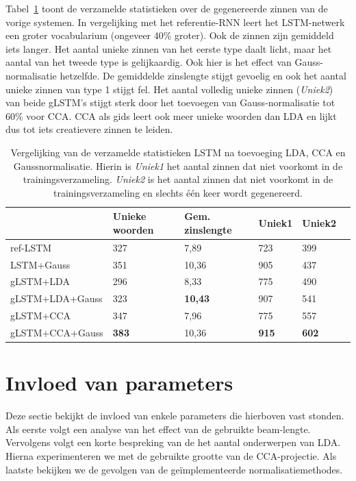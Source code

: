 Tabel~\ref{table:lstm_stats} toont de verzamelde statistieken over de gegenereerde zinnen van de vorige systemen. In vergelijking met het referentie-RNN leert het LSTM-netwerk een groter vocabularium (ongeveer 40\% groter). Ook de zinnen zijn gemiddeld iets langer. Het aantal unieke zinnen van het eerste type daalt licht, maar het aantal van het tweede type is gelijkaardig.
Ook hier is het effect van Gauss-normalisatie hetzelfde. De gemiddelde zinslengte stijgt gevoelig en ook het aantal unieke zinnen van type 1 stijgt fel. Het aantal volledig unieke zinnen (\emph{Uniek2}) van beide gLSTM's stijgt sterk door het toevoegen van Gauss-normalisatie tot 60\% voor CCA. CCA als gids leert ook meer unieke woorden dan LDA en lijkt dus tot iets creatievere zinnen te leiden.
    \begin{table}
    	\centering
    	\begin{tabular}{llllll}
    		~                   & Unieke woorden & Gem. zinslengte & Uniek1 & Uniek2 \\ \hline
    		ref-LSTM         				  & 327   & 7,89   & 723   & 399  \\
    		LSTM+Gauss        				  & 351   & 10,36   & 905   & 437  \\
    		gLSTM+LDA         				  & 296   & 8,33   & 775   & 490     \\
    		gLSTM+LDA+Gauss 				  & 323   & \textbf{10,43}   & 907   & 541     \\
    		gLSTM+CCA         				  & 347   & 7,96   & 775   &557   \\
    		gLSTM+CCA+Gauss 				  & \textbf{383}   & 10,36   & \textbf{915}   & \textbf{602}    \\\hline
    	\end{tabular}
	\caption[Vergelijking van de verzamelde statistieken LSTM na toevoeging LDA, CCA en Gaussnormalisatie]{Vergelijking van de verzamelde statistieken LSTM na toevoeging LDA, CCA en Gaussnormalisatie. Hierin is \emph{Uniek1} het aantal zinnen dat niet voorkomt in de trainingsverzameling. \emph{Uniek2} is het aantal zinnen dat niet voorkomt in de trainingsverzameling en slechts \'e\'en keer wordt gegenereerd.}
    	\label{table:lstm_stats}
    \end{table}
    
\section{Invloed van parameters}
\label{sec:invloed-parameters}
Deze sectie bekijkt de invloed van enkele parameters die hierboven vast stonden. Als eerste volgt een analyse van het effect van de gebruikte beam-lengte. Vervolgens volgt een korte bespreking van de het aantal onderwerpen van LDA. Hierna experimenteren we met de gebruikte grootte van de CCA-projectie. Als laatste bekijken we de gevolgen van de ge\"implementeerde normalisatiemethodes.

